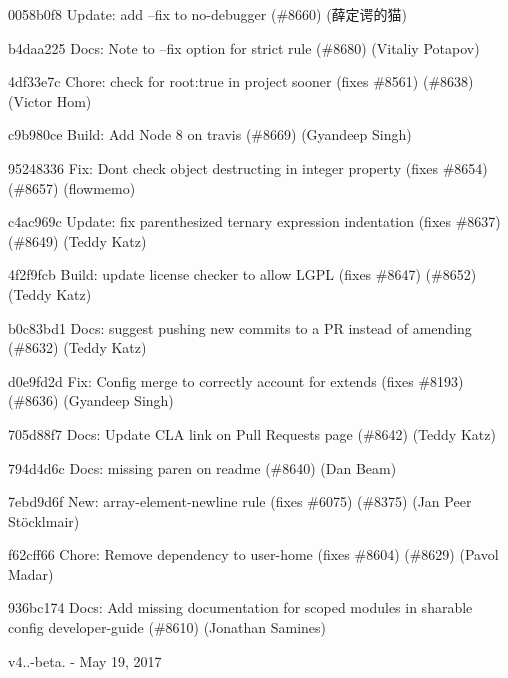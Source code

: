 \begin{DoxyItemize}
\item 0058b0f8 Update\+: add --fix to no-\/debugger (\#8660) (薛定谔的猫)
\item b4daa225 Docs\+: Note to --fix option for strict rule (\#8680) (Vitaliy Potapov)
\item 4df33e7c Chore\+: check for root\+:true in project sooner (fixes \#8561) (\#8638) (Victor Hom)
\item c9b980ce Build\+: Add Node 8 on travis (\#8669) (Gyandeep Singh)
\item 95248336 Fix\+: Don\textquotesingle{}t check object destructing in integer property (fixes \#8654) (\#8657) (flowmemo)
\item c4ac969c Update\+: fix parenthesized ternary expression indentation (fixes \#8637) (\#8649) (Teddy Katz)
\item 4f2f9fcb Build\+: update license checker to allow LGPL (fixes \#8647) (\#8652) (Teddy Katz)
\item b0c83bd1 Docs\+: suggest pushing new commits to a PR instead of amending (\#8632) (Teddy Katz)
\item d0e9fd2d Fix\+: Config merge to correctly account for extends (fixes \#8193) (\#8636) (Gyandeep Singh)
\item 705d88f7 Docs\+: Update CLA link on Pull Requests page (\#8642) (Teddy Katz)
\item 794d4d6c Docs\+: missing paren on readme (\#8640) (Dan Beam)
\item 7ebd9d6f New\+: array-\/element-\/newline rule (fixes \#6075) (\#8375) (Jan Peer Stöcklmair)
\item f62cff66 Chore\+: Remove dependency to user-\/home (fixes \#8604) (\#8629) (Pavol Madar)
\item 936bc174 Docs\+: Add missing documentation for scoped modules in sharable config developer-\/guide (\#8610) (Jonathan Samines)
\end{DoxyItemize}

v4..-\/beta. -\/ May 19, 2017


